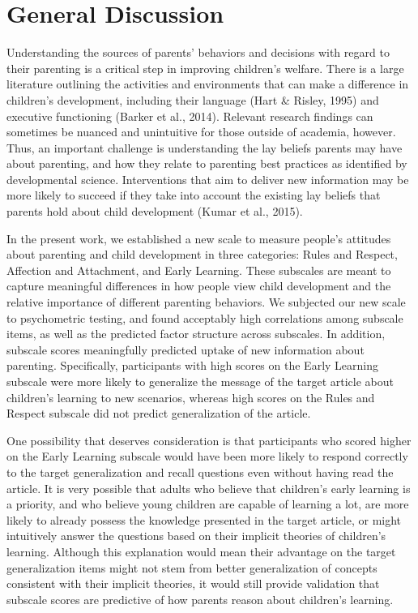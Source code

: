 \documentclass[10pt, letterpaper]{article}
\begin{document}
\section{General Discussion}\label{general-discussion}

Understanding the sources of parents' behaviors and decisions with
regard to their parenting is a critical step in improving children's
welfare. There is a large literature outlining the activities and
environments that can make a difference in children's development,
including their language (Hart \& Risley, 1995) and executive
functioning (Barker et al., 2014). Relevant research findings can
sometimes be nuanced and unintuitive for those outside of academia,
however. Thus, an important challenge is understanding the lay beliefs
parents may have about parenting, and how they relate to parenting best
practices as identified by developmental science. Interventions that aim
to deliver new information may be more likely to succeed if they take
into account the existing lay beliefs that parents hold about child
development (Kumar et al., 2015).

In the present work, we established a new scale to measure people's
attitudes about parenting and child development in three categories:
Rules and Respect, Affection and Attachment, and Early Learning. These
subscales are meant to capture meaningful differences in how people view
child development and the relative importance of different parenting
behaviors. We subjected our new scale to psychometric testing, and found
acceptably high correlations among subscale items, as well as the
predicted factor structure across subscales. In addition, subscale
scores meaningfully predicted uptake of new information about parenting.
Specifically, participants with high scores on the Early Learning
subscale were more likely to generalize the message of the target
article about children's learning to new scenarios, whereas high scores
on the Rules and Respect subscale did not predict generalization of the
article.

One possibility that deserves consideration is that participants who
scored higher on the Early Learning subscale would have been more likely
to respond correctly to the target generalization and recall questions
even without having read the article. It is very possible that adults
who believe that children's early learning is a priority, and who
believe young children are capable of learning a lot, are more likely to
already possess the knowledge presented in the target article, or might
intuitively answer the questions based on their implicit theories of
children's learning. Although this explanation would mean their
advantage on the target generalization items might not stem from better
generalization of concepts consistent with their implicit theories, it
would still provide validation that subscale scores are predictive of
how parents reason about children's learning.
\end{document}
